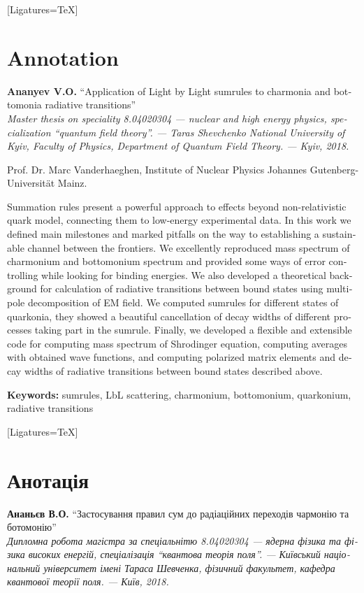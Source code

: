 \begin{titlepage}
    \fontsize{12}{12}\linespread{1.2}\selectfont
    \begin{otherlanguage}{english}
    [Ligatures=TeX]
    \section*{Annotation}
    \textbf{Ananyev V.O.} ``Application of Light by Light sumrules to charmonia and bottomonia radiative transitions'' \\
    {\itshape Master thesis on speciality 8.04020304 --- nuclear and high energy physics, specialization ``quantum field theory''. --- Taras Shevchenko National University of Kyiv, Faculty of Physics, Department of Quantum Field Theory. --- Kyiv, 2018.}

     Prof. Dr. Marc Vanderhaeghen, Institute of Nuclear Physics
Johannes Gutenberg-Universität Mainz.

        Summation rules present a powerful approach to effects beyond non-relativistic quark model, connecting them to low-energy experimental data. In this work we defined main milestones and marked pitfalls on the way to establishing a sustainable channel between the frontiers. We excellently reproduced mass spectrum of charmonium and bottomonium spectrum and provided some ways of error controlling while looking for binding energies. We also developed a theoretical background for calculation of radiative transitions between bound states using multipole decomposition of EM field. We computed sumrules for different states of quarkonia, they showed a beautiful cancellation of decay widths of different processes taking part in the sumrule. Finally, we developed a flexible and extensible code for computing mass spectrum of Shrodinger equation, computing averages with obtained wave functions, and computing polarized matrix elements and decay widths of radiative transitions between bound states described above.

    \textbf{Keywords:} sumrules, LbL scattering, charmonium, bottomonium, quarkonium, radiative transitions
    \end{otherlanguage}
    \vspace{-1cm}
    \begin{otherlanguage}{ukrainian}
    [Ligatures=TeX]
    \section*{Анотація}
    \textbf{Ананьєв В.О.} ``Застосування правил сум до радіаційних переходів чармонію та ботомонію'' \\
    {\itshape Дипломна робота магістра за спеціальнітю 8.04020304 --- ядерна фізика та фізика високих енергій, спеціалізація ``квантова теорія поля''. --- Київський національний університет імені Тараса Шевченка, фізичний факультет, кафедра квантової теорії поля. --- Київ, 2018.}


\end{otherlanguage}
\end{titlepage}
